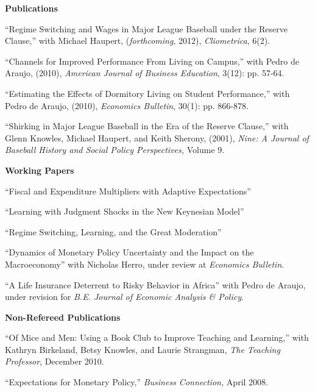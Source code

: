 \documentclass[11pt]{article}
\newcommand{\bd}{\begin{description}}
\newcommand{\ed}{\end{description}}
\newcommand{\toprule}{\par\vspace*{2pt}\noindent{\hrule\hfill}\par\vspace*{1pt}}
\begin{document}
\noindent \textbf{Publications} \toprule
\bd
\item ``Regime Switching and Wages in Major League Baseball under the Reserve Clause,'' with Michael Haupert, (\textit{forthcoming}, 2012), \textit{Cliometrica}, 6(2).
\item ``Channels for Improved Performance From Living on Campus,'' with Pedro de Araujo, (2010), \textit{American Journal of Business Education}, 3(12): pp. 57-64.
\item ``Estimating the Effects of Dormitory Living on Student Performance,'' with Pedro de Araujo, (2010), \textit{Economics Bulletin}, 30(1): pp. 866-878.
\item ``Shirking in Major League Baseball in the Era of the Reserve Clause,'' with Glenn Knowles, Michael Haupert, and Keith Sherony, (2001), \textit{Nine: A Journal of Baseball History and Social Policy Perspectives,}  Volume 9. \\
\ed

\newpage
\noindent \textbf{Working Papers} \toprule
\bd
\item ``Fiscal and Expenditure Multipliers with Adaptive Expectations''
\item ``Learning with Judgment Shocks in the New Keynesian Model''
\item ``Regime Switching, Learning, and the Great Moderation'' 
\item ``Dynamics of Monetary Policy Uncertainty and the Impact on the Macroeconomy'' with Nicholas Herro, under review at \textit{Economics Bulletin}.
\item ``A Life Insurance Deterrent to Risky Behavior in Africa'' with Pedro de Araujo, under revision for \textit{B.E. Journal of Economic Analysis \& Policy}. 
\ed

\noindent \textbf{Non-Refereed Publications} \toprule
\bd
\item ``Of Mice and Men: Using a Book Club to Improve Teaching and Learning,'' with Kathryn Birkeland, Betsy Knowles, and Laurie Strangman, \textit{The Teaching Professor}, December 2010.
\item ``Expectations for Monetary Policy,'' \textit{Business Connection,}  April 2008. \\ 
\ed
\end{document}
